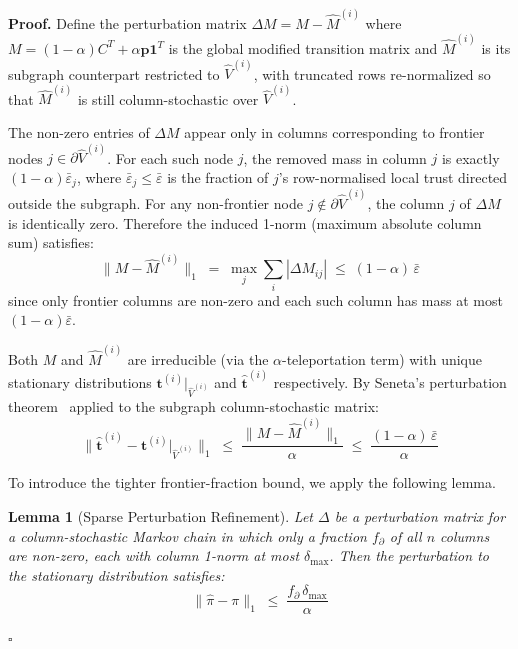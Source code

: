 \documentclass[11pt]{article}
\newtheorem{lemma}[theorem]{Lemma}
\newcommand{\qed}{\hfill}
\newenvironment{proof}{\noindent\textbf{Proof.}}{\qed$\square$\par\medskip}
\begin{document}
\begin{proof}
Define the perturbation matrix $\Delta M = M - \hat{M}^{(i)}$ where $M = (1-\alpha)C^T + \alpha\mathbf{p}\mathbf{1}^T$ is the global modified transition matrix and $\hat{M}^{(i)}$ is its subgraph counterpart restricted to $\hat{V}^{(i)}$, with truncated rows re-normalized so that $\hat{M}^{(i)}$ is still column-stochastic over $\hat{V}^{(i)}$.

The non-zero entries of $\Delta M$ appear only in columns corresponding to frontier nodes $j \in \partial \hat{V}^{(i)}$. For each such node $j$, the removed mass in column $j$ is exactly $(1-\alpha)\bar{\varepsilon}_j$, where $\bar{\varepsilon}_j \leq \bar{\varepsilon}$ is the fraction of $j$'s row-normalised local trust directed outside the subgraph. For any non-frontier node $j \notin \partial\hat{V}^{(i)}$, the column $j$ of $\Delta M$ is identically zero. Therefore the induced 1-norm (maximum absolute column sum) satisfies:
\[
    \|M - \hat{M}^{(i)}\|_1 \;=\; \max_j \sum_i |\Delta M_{ij}|
    \;\leq\; (1-\alpha)\,\bar{\varepsilon}
\]
since only frontier columns are non-zero and each such column has mass at most $(1-\alpha)\bar{\varepsilon}$.

Both $M$ and $\hat{M}^{(i)}$ are irreducible (via the $\alpha$-teleportation term) with unique stationary distributions $\mathbf{t}^{(i)}\big|_{\hat{V}^{(i)}}$ and $\hat{\mathbf{t}}^{(i)}$ respectively. By Seneta's perturbation theorem~\cite[Theorem~2.1]{seneta1979} applied to the subgraph column-stochastic matrix:
\begin{equation}\label{eq:seneta_worst}
    \bigl\|\hat{\mathbf{t}}^{(i)} - \mathbf{t}^{(i)}\big|_{\hat{V}^{(i)}}\bigr\|_1
    \;\leq\; \frac{\|M - \hat{M}^{(i)}\|_1}{\alpha}
    \;\leq\; \frac{(1-\alpha)\,\bar{\varepsilon}}{\alpha}
\end{equation}

To introduce the tighter frontier-fraction bound, we apply the following lemma.

\begin{lemma}[Sparse Perturbation Refinement]\label{lem:sparse_perturbation}
Let $\Delta$ be a perturbation matrix for a column-stochastic Markov chain in which only a fraction $f_\partial$ of all $n$ columns are non-zero, each with column 1-norm at most $\delta_{\max}$. Then the perturbation to the stationary distribution satisfies:
\[
    \|\hat{\pi} - \pi\|_1 \;\leq\; \frac{f_\partial\,\delta_{\max}}{\alpha}
\]
\end{lemma}


\end{proof}
\end{document}
